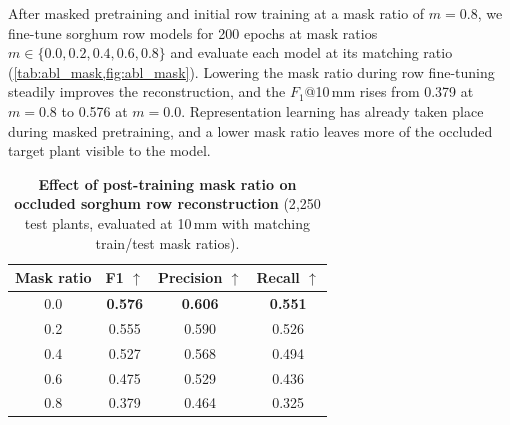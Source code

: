 \documentclass[10pt,twocolumn,letterpaper]{article}
\begin{document}
After masked pretraining and initial row training at a mask ratio of $m = 0.8$, we fine-tune sorghum row models for 200 epochs at mask ratios $m \in \{0.0, 0.2, 0.4, 0.6, 0.8\}$ and evaluate each model at its matching ratio (\cref{tab:abl_mask,fig:abl_mask}). Lowering the mask ratio during row fine-tuning steadily improves the reconstruction, and the $F_1$@10\,mm rises from 0.379 at $m = 0.8$ to 0.576 at $m = 0.0$. Representation learning has already taken place during masked pretraining, and a lower mask ratio leaves more of the occluded target plant visible to the model.

\begin{table}[t]
  \caption{\textbf{Effect of post-training mask ratio on occluded sorghum row reconstruction} (2{,}250 test plants, evaluated at 10\,mm with matching train/test mask ratios).}
  \label{tab:abl_mask}
  \centering\small
  \begin{tabular}{@{}cccc@{}}
    \toprule
    Mask ratio & F1 $\uparrow$ & Precision $\uparrow$ & Recall $\uparrow$ \\
    \midrule
    0.0 & \textbf{0.576} & \textbf{0.606} & \textbf{0.551} \\
    0.2 & 0.555 & 0.590 & 0.526 \\
    0.4 & 0.527 & 0.568 & 0.494 \\
    0.6 & 0.475 & 0.529 & 0.436 \\
    0.8 & 0.379 & 0.464 & 0.325 \\
    \bottomrule
  \end{tabular}
\end{table}
\end{document}
